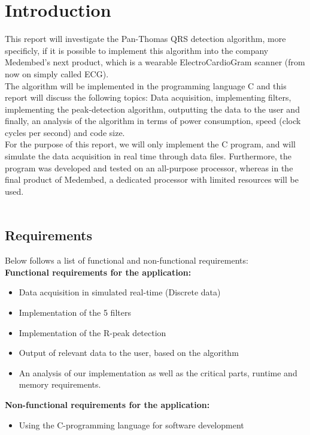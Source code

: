 \documentclass[12pt,a4paper]{article}
\begin{document}
\section{Introduction}
	This report will investigate the Pan-Thomas QRS detection algorithm, more specificly, if it is possible to implement this algorithm into the company Medembed's next product, which is a wearable ElectroCardioGram scanner (from now on simply called ECG).\\
	The algorithm will be implemented in the programming language C and this report will discuss the following topics: Data acquisition, implementing filters, implementing the peak-detection algorithm, outputting the data to the user and finally, an analysis of the algorithm in terms of power consumption, speed (clock cycles per second) and code size.\\
	For the purpose of this report, we will only implement the C program, and will simulate the data acquisition in real time through data files. Furthermore, the program was developed and tested on an all-purpose processor, whereas in the final product of Medembed, a dedicated processor with limited resources will be used.\\
\\
\subsection{Requirements}
Below follows a list of functional and non-functional requirements:\\

\textbf{ Functional requirements for the application:}
\begin{itemize}
	\item Data acquisition in simulated real-time (Discrete data)
	\item Implementation of the 5 filters
	\item Implementation of the R-peak detection
	\item Output of relevant data to the user, based on the algorithm
	\item An analysis of our implementation as well as the critical parts, runtime and memory requirements.
\end{itemize}
\textbf{Non-functional requirements for the application:}
\begin {itemize}
	\item Using the C-programming language for software development
\end{itemize}
\end{document}
